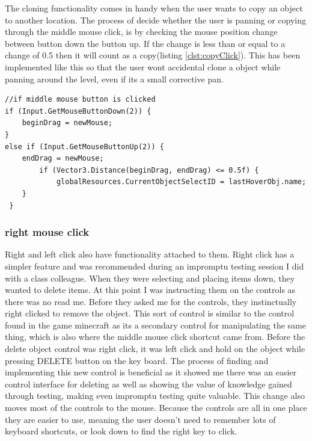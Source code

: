 The cloning functionality comes in handy when the user wants to copy an object to another location. The process of decide whether the user is panning or copying through the middle mouse click, is by checking the mouse position change between button down the button up. If the change is less than or equal to a change of 0.5 then it will count as a copy(listing \ref{clst:copyClick}). This has been implemented like this so that the user wont accidental clone a object while panning around the level, even if its a small corrective pan.
\begin{minipage}{\textwidth}
\begin{lstlisting}[language={[Sharp]C}, caption=Copy Object, label=clst:copyClick]
//if middle mouse button is clicked
if (Input.GetMouseButtonDown(2)) {
	beginDrag = newMouse;
}
else if (Input.GetMouseButtonUp(2)) {
	endDrag = newMouse;
		if (Vector3.Distance(beginDrag, endDrag) <= 0.5f) {
			globalResources.CurrentObjectSelectID = lastHoverObj.name;
	}
 }
\end{lstlisting}
\end{minipage}

\subsubsection{right mouse click}
Right and left click also have functionality attached to them. Right click has a simpler feature and was recommended during an impromptu testing session I did with a class colleague. When they were selecting and placing items down, they wanted to delete items. At this point I was instructing them on the controls as there was no read me. Before they asked me for the controls, they instinctually right clicked to remove the object. This sort of control is similar to the control found in the game minecraft as its a secondary control for manipulating the same thing, which is also where the middle mouse click shortcut came from. Before the delete object control was right click, it was left click and hold on the object while pressing DELETE button on the key board. The process of finding and implementing this new control is beneficial as it showed me there was an easier control interface for deleting as well as showing the value of knowledge gained through testing, making even impromptu testing quite valuable. This change also moves most of the controls to the mouse. Because the controls are all in one place they are easier to use, meaning the user doesn't need to remember lots of keyboard shortcuts, or look down to find the right key to click.

